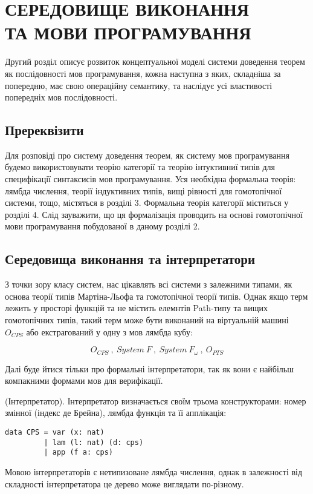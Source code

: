 
\chapter{СЕРЕДОВИЩЕ ВИКОНАННЯ \\ТА МОВИ ПРОГРАМУВАННЯ}

Другий розділ описує розвиток концептуальної моделі системи доведення теорем
як послідовності мов програмування, кожна наступна з яких, складніша за попередню,
має свою операційну семантику, та наслідує усі властивості попередніх мов послідовності.

\section{Пререквізити}

Для розповіді про систему доведення теорем, як систему мов програмування
будемо використовувати теорію категорії та теорію інтуктивниї
типів для специфікації синтаксисів мов програмування. Уся необхідна формальна теорія:
лямбда числення, теорії індуктивних типів, вищі рівності для гомотопічної системи,
тощо, містяться в розділі 3. Формальна теорія категорії міститься у розділі 4.
Слід зауважити, що ця формалізація проводить на основі гомотопічної
мови програмування побудованої в даному розділі 2.

\section*{Середовища виконання та інтерпретатори}

З точки зору класу систем, нас цікавлять всі системи з залежними типами,
як основа теорії типів Мартіна-Льофа та гомотопічної теорії типів. Однак
якщо терм лежить у просторі функцій та не містить елемнтів Path-типу та
вищих гомотопічних типів, такий терм може бути виконаний
на віртуальній машині $O_{CPS}$ або екстрагований у одну з мов лямбда кубу:

$$
O_{CPS}\ ,\ System\ {F}\ ,\ System\ {F_\omega}\ ,\ O_{PTS}
$$

Далі буде йтися тільки про формальні інтерпретатори,
так як вони є найбільш компакними формами мов для верифікації.

\begin{definition} (Інтерпретатор). Інтерпретатор визначається
своїм трьома конструкторами: номер змінної (індекс де Брейна),
лямбда функція та її апплікація:
\begin{lstlisting}
data CPS = var (x: nat)
         | lam (l: nat) (d: cps)
         | app (f a: cps)
\end{lstlisting}
Мовою інтерпретаторів є нетипизоване лямбда числення, однак в залежності
від складності інтерпретатора це дерево може виглядати по-різному.
\end{definition}

